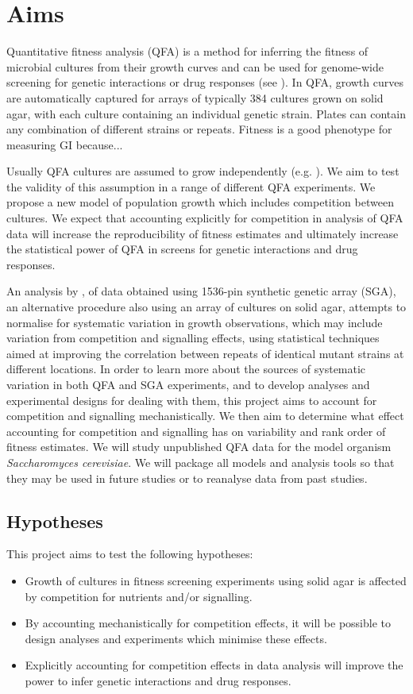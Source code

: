 
\section{Aims}
\label{sec:aims}
Quantitative fitness analysis (QFA) is a method for inferring the
fitness of microbial cultures from their growth curves and can be used
for genome-wide screening for genetic interactions or drug responses
(see
\citet{Addinall2008,Addinall2011,Lawless2010,Banks2012,Andrew2013}). In
QFA, growth curves are automatically captured for arrays of typically
384 cultures grown on solid agar, with each culture containing an
individual genetic strain. Plates can contain any combination of
different strains or repeats. Fitness is a good phenotype for measuring GI because...

Usually QFA cultures are assumed to grow independently
(e.g. \citet{Addinall2011}). We aim to test the validity of this
assumption in a range of different QFA experiments. We propose a new
model of population growth which includes competition between
cultures. We expect that accounting explicitly for competition
in analysis of QFA data will increase the reproducibility of fitness
estimates and ultimately increase the statistical power of QFA in
screens for genetic interactions and drug responses.

An analysis by \citet{Baryshnikova2010}, of data obtained using
1536-pin synthetic genetic array (SGA), an alternative procedure also
using an array of cultures on solid agar, attempts to normalise for
systematic variation in growth observations, which may include
variation from competition and signalling effects, using statistical
techniques aimed at improving the correlation between repeats of
identical mutant strains at different locations. In order to learn
more about the sources of systematic variation in both QFA and SGA
experiments, and to develop analyses and experimental designs for
dealing with them, this project aims to account for competition and
signalling mechanistically. We then aim to determine what effect
accounting for competition and signalling has on variability and rank
order of fitness estimates. We will study unpublished QFA data for the
model organism \textit{Saccharomyces cerevisiae}. We will package all
models and analysis tools so that they may be used in future studies
or to reanalyse data from past studies.

\subsection{Hypotheses}
This project aims to test the following hypotheses:
\begin{itemize}
\item Growth of cultures in fitness screening experiments using solid
  agar is affected by competition for nutrients and/or signalling.
\item By accounting mechanistically for competition effects, it will
  be possible to design analyses and experiments which minimise these effects.
\item Explicitly accounting for competition effects in data analysis
  will improve the power to infer genetic interactions and drug
  responses.
\end{itemize}

